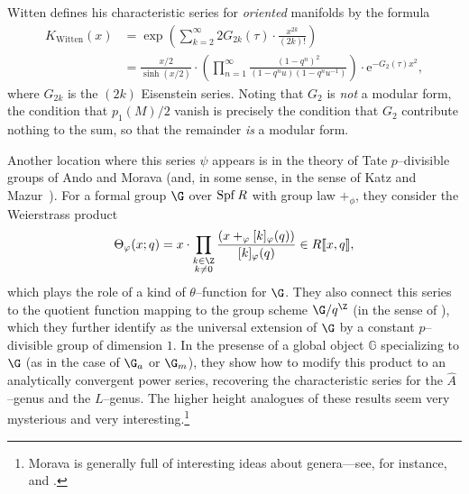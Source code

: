 \begin{remark}\label{WittenCharSeries}
Witten defines his characteristic series for \emph{oriented} manifolds by the formula
\begin{align*}
K_{\mathrm{Witten}}(x) & = \exp\left( \sum_{k=2}^\infty 2 G_{2k}(\tau) \cdot \frac{x^{2k}}{(2k)!} \right) \\
& = \frac{x/2}{\sinh(x/2)} \cdot \left(\prod_{n=1}^\infty \frac{(1 - q^n)^2}{(1 - q^n u)(1 - q^n u^{-1})}\right) \cdot \mathrm e^{-G_2(\tau) x^2},
\end{align*}
where \(G_{2k}\) is the \((2k)\){\th} Eisenstein series.  Noting that \(G_2\) is \emph{not} a modular form, the condition that \(p_1(M) / 2\) vanish is precisely the condition that \(G_2\) contribute nothing to the sum, so that the remainder \emph{is} a modular form.
\end{remark}

\begin{remark}
Another location where this series \(\psi\) appears is in the theory of Tate \(p\)--divisible groups of Ando and Morava (and, in some sense, in the sense of Katz and Mazur~\cite[Sections 8.7--8]{KatzMazur}).  For a formal group \(\G\) over \(\operatorname{Spf} R\) with group law \(+_\phi\), they consider the Weierstrass product \[\Theta_{\phi}(x; q) = x \cdot \prod_{\substack{k \in \Z \\ k \ne 0}} \frac{(x +_\phi [k]_\phi(q))}{[k]_\phi(q)} \in R\ps{x,q},\] which plays the role of a kind of \(\theta\)--function for \(\G\).  They also connect this series to the quotient function mapping to the group scheme \(\G / q^{\Z}\) (in the sense of ), which they further identify as the universal extension of \(\G\) by a constant \(p\)--divisible group of dimension \(1\).  In the presense of a global object \(\mathbb G\) specializing to \(\G\) (as in the case of \(\G_a\) or \(\G_m\)), they show how to modify this product to an analytically convergent power series, recovering the characteristic series for the \(\widehat A\)--genus and the \(L\)--genus.  The higher height analogues of these results seem very mysterious and very interesting.\footnote{Morava is generally full of interesting ideas about genera---see, for instance,~\cite{MoravaMotivicThomIso} and \cite{MoravaTHH}.}
\end{remark}

